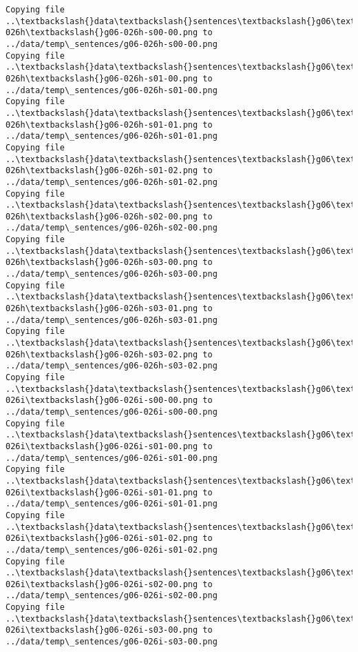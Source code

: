 \documentclass[11pt]{article}
\begin{document}
\begin{Verbatim}[commandchars=\\\{\}]
Copying file ..\textbackslash{}data\textbackslash{}sentences\textbackslash{}g06\textbackslash{}g06-026h\textbackslash{}g06-026h-s00-00.png to
../data/temp\_sentences/g06-026h-s00-00.png
Copying file ..\textbackslash{}data\textbackslash{}sentences\textbackslash{}g06\textbackslash{}g06-026h\textbackslash{}g06-026h-s01-00.png to
../data/temp\_sentences/g06-026h-s01-00.png
Copying file ..\textbackslash{}data\textbackslash{}sentences\textbackslash{}g06\textbackslash{}g06-026h\textbackslash{}g06-026h-s01-01.png to
../data/temp\_sentences/g06-026h-s01-01.png
Copying file ..\textbackslash{}data\textbackslash{}sentences\textbackslash{}g06\textbackslash{}g06-026h\textbackslash{}g06-026h-s01-02.png to
../data/temp\_sentences/g06-026h-s01-02.png
Copying file ..\textbackslash{}data\textbackslash{}sentences\textbackslash{}g06\textbackslash{}g06-026h\textbackslash{}g06-026h-s02-00.png to
../data/temp\_sentences/g06-026h-s02-00.png
Copying file ..\textbackslash{}data\textbackslash{}sentences\textbackslash{}g06\textbackslash{}g06-026h\textbackslash{}g06-026h-s03-00.png to
../data/temp\_sentences/g06-026h-s03-00.png
Copying file ..\textbackslash{}data\textbackslash{}sentences\textbackslash{}g06\textbackslash{}g06-026h\textbackslash{}g06-026h-s03-01.png to
../data/temp\_sentences/g06-026h-s03-01.png
Copying file ..\textbackslash{}data\textbackslash{}sentences\textbackslash{}g06\textbackslash{}g06-026h\textbackslash{}g06-026h-s03-02.png to
../data/temp\_sentences/g06-026h-s03-02.png
Copying file ..\textbackslash{}data\textbackslash{}sentences\textbackslash{}g06\textbackslash{}g06-026i\textbackslash{}g06-026i-s00-00.png to
../data/temp\_sentences/g06-026i-s00-00.png
Copying file ..\textbackslash{}data\textbackslash{}sentences\textbackslash{}g06\textbackslash{}g06-026i\textbackslash{}g06-026i-s01-00.png to
../data/temp\_sentences/g06-026i-s01-00.png
Copying file ..\textbackslash{}data\textbackslash{}sentences\textbackslash{}g06\textbackslash{}g06-026i\textbackslash{}g06-026i-s01-01.png to
../data/temp\_sentences/g06-026i-s01-01.png
Copying file ..\textbackslash{}data\textbackslash{}sentences\textbackslash{}g06\textbackslash{}g06-026i\textbackslash{}g06-026i-s01-02.png to
../data/temp\_sentences/g06-026i-s01-02.png
Copying file ..\textbackslash{}data\textbackslash{}sentences\textbackslash{}g06\textbackslash{}g06-026i\textbackslash{}g06-026i-s02-00.png to
../data/temp\_sentences/g06-026i-s02-00.png
Copying file ..\textbackslash{}data\textbackslash{}sentences\textbackslash{}g06\textbackslash{}g06-026i\textbackslash{}g06-026i-s03-00.png to
../data/temp\_sentences/g06-026i-s03-00.png

\end{Verbatim}
\end{document}
